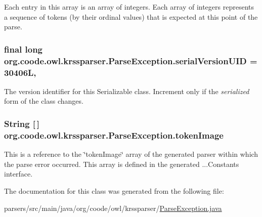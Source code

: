 Each entry in this array is an array of integers. Each array of integers represents a sequence of tokens (by their ordinal values) that is expected at this point of the parse. \hypertarget{classorg_1_1coode_1_1owl_1_1krssparser_1_1_parse_exception_a71ec3f0951e37e345d2298d5b9a16544}{
\subsubsection[{serial\-Version\-U\-I\-D}]{\setlength{\rightskip}{0pt plus 5cm}final long org.\-coode.\-owl.\-krssparser.\-Parse\-Exception.\-serial\-Version\-U\-I\-D = 30406\-L\hspace{0.3cm}{\ttfamily [static]}, {\ttfamily [private]}}}\label{classorg_1_1coode_1_1owl_1_1krssparser_1_1_parse_exception_a71ec3f0951e37e345d2298d5b9a16544}
The version identifier for this Serializable class. Increment only if the {\itshape serialized} form of the class changes. \hypertarget{classorg_1_1coode_1_1owl_1_1krssparser_1_1_parse_exception_af6ee3cfb4377ffaa7eaa55dc3fa619ae}{
\subsubsection[{token\-Image}]{\setlength{\rightskip}{0pt plus 5cm}String \mbox{[}$\,$\mbox{]} org.\-coode.\-owl.\-krssparser.\-Parse\-Exception.\-token\-Image}}\label{classorg_1_1coode_1_1owl_1_1krssparser_1_1_parse_exception_af6ee3cfb4377ffaa7eaa55dc3fa619ae}
This is a reference to the \char`\"{}token\-Image\char`\"{} array of the generated parser within which the parse error occurred. This array is defined in the generated ...Constants interface. 

The documentation for this class was generated from the following file\-:\begin{DoxyCompactItemize}
\item 
parsers/src/main/java/org/coode/owl/krssparser/\hyperlink{org_2coode_2owl_2krssparser_2_parse_exception_8java}{Parse\-Exception.\-java}\end{DoxyCompactItemize}

